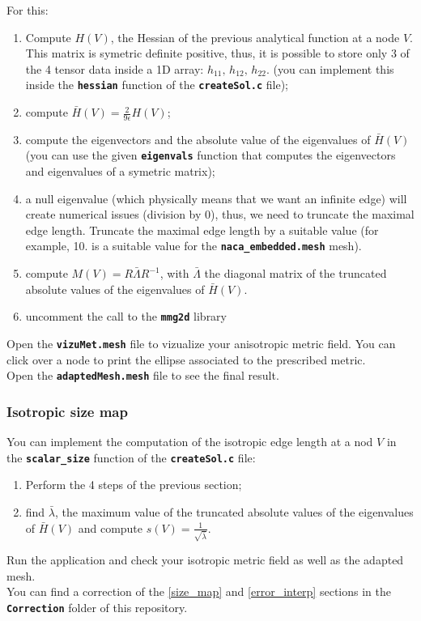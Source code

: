 \documentclass{article}
\newcommand{\ttb}[1]{\texttt{\textbf{#1}}}
\begin{document}
For this:

\begin{enumerate}
\item Compute $H(V)$, the Hessian of the previous analytical function
  at a node $V$. This matrix is symetric definite positive, thus, it
  is possible to store only 3 of the 4 tensor data inside a 1D array:
  $h_{11},\,h_{12},\,h_{22}$. (you can implement this
  inside the \ttb{hessian} function of the \ttb{createSol.c} file);
\item compute $\bar{H}(V) = \frac{2}{9\epsilon}H(V)$;
\item compute the eigenvectors and the absolute value of the
  eigenvalues of $\bar{H}(V)$ (you can use the given \ttb{eigenvals}
  function that computes the eigenvectors and eigenvalues of a
  symetric matrix);
\item a null eigenvalue (which physically means that we want an
  infinite edge) will create numerical issues (division by 0), thus, we
  need to truncate the maximal edge length. Truncate the maximal edge
  length by a suitable value (for example, 10. is a suitable value for
  the \ttb{naca\_embedded.mesh} mesh).
\item compute $M(V) = R \bar{\Lambda} R^{-1}$, with
  $\bar{\Lambda}$ the diagonal matrix of the truncated absolute values
  of the eigenvalues of $\bar{H}(V)$.
\item uncomment the call to the \ttb{mmg2d} library
\end{enumerate}

Open the \ttb{vizuMet.mesh} file to vizualize your anisotropic metric field.
You can click over a node to print the ellipse associated to the prescribed metric.\\

Open the \ttb{adaptedMesh.mesh} file to see the final result.

\subsubsection{Isotropic size map}
You can implement the computation of the isotropic edge length at a
nod $V$ in the \ttb{scalar\_size} function of the \ttb{createSol.c}
file:

\begin{enumerate}
\item Perform the 4 steps of the previous section;
\item find $\bar{\lambda}$, the maximum value of the truncated absolute values
  of the eigenvalues of $\bar{H}(V)$ and compute
  $ s(V) = \frac{1}{\sqrt{\bar{\lambda}}}$.
\end{enumerate}
Run the application and check your isotropic metric
field as well as the adapted mesh.\\

You can find a correction of the \ref{size_map} and
\ref{error_interp} sections in the \ttb{Correction} folder of this repository.
\end{document}
